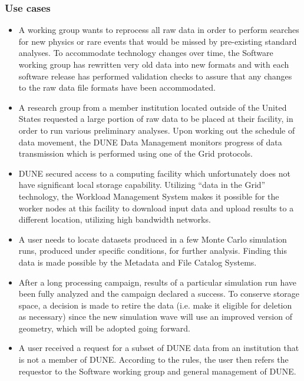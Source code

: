 \subsubsection{Use cases}
\begin{itemize}
\item A working group wants to reprocess all raw data in order to perform searches for new physics or rare events that would be missed by pre-existing standard analyses.  To accommodate technology changes over time, the Software working group has rewritten very old data into new formats and with each software release has performed validation checks to assure that any changes to the raw data file formats have been accommodated.

\item A research group from a member institution located outside of the United States requested a large portion of raw data to be placed at their facility, in order to run various preliminary analyses. Upon working out the schedule of data movement, the DUNE Data Management  monitors progress of data transmission which is performed using one of the Grid protocols.

\item DUNE secured access to a computing facility which unfortunately does not have significant local storage capability. Utilizing ``data in the Grid'' technology, the Workload Management System makes it possible for the worker nodes at this facility to download input data and upload results to a different location, utilizing high bandwidth networks.

\item A user needs to locate datasets produced in a few Monte Carlo simulation runs, produced under specific conditions, for further analysis. Finding this data is made possible by the Metadata and File Catalog Systems.

\item After a long processing campaign, results of a particular simulation run have been fully analyzed and the campaign declared a success. To conserve storage space, a decision is made to retire the data (i.e. make it eligible for deletion as necessary) since the new simulation wave will use an improved version of geometry, which will be adopted going forward.


\item A user received a request for a subset of DUNE data from an institution that is not a member of DUNE. According to the rules, the user then refers the requestor to the
Software working group and general management of DUNE.
\end{itemize}
